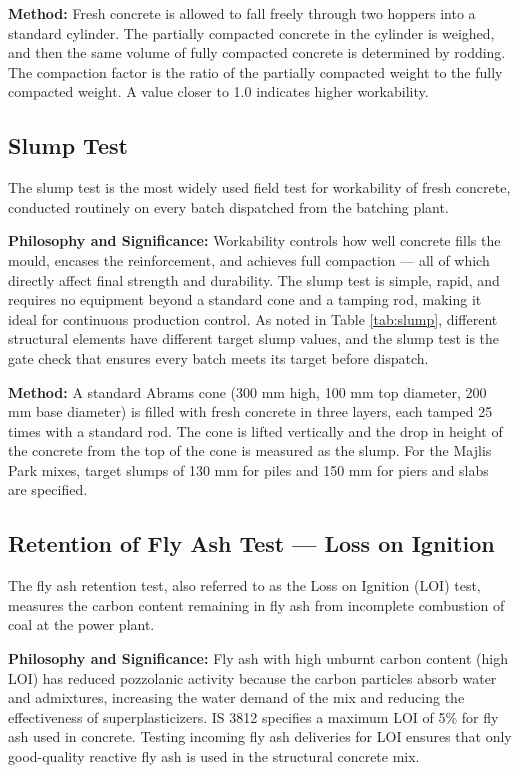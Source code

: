 \par\noindent
\textbf{Method:} Fresh concrete is allowed to fall freely through two hoppers into a standard cylinder. The partially compacted concrete in the cylinder is weighed, and then the same volume of fully compacted concrete is determined by rodding. The compaction factor is the ratio of the partially compacted weight to the fully compacted weight. A value closer to 1.0 indicates higher workability.

\subsection{Slump Test}
\par\noindent
The slump test is the most widely used field test for workability of fresh concrete, conducted routinely on every batch dispatched from the batching plant.

\par\noindent
\textbf{Philosophy and Significance:} Workability controls how well concrete fills the mould, encases the reinforcement, and achieves full compaction --- all of which directly affect final strength and durability. The slump test is simple, rapid, and requires no equipment beyond a standard cone and a tamping rod, making it ideal for continuous production control. As noted in Table \ref{tab:slump}, different structural elements have different target slump values, and the slump test is the gate check that ensures every batch meets its target before dispatch.

\par\noindent
\textbf{Method:} A standard Abrams cone (300 mm high, 100 mm top diameter, 200 mm base diameter) is filled with fresh concrete in three layers, each tamped 25 times with a standard rod. The cone is lifted vertically and the drop in height of the concrete from the top of the cone is measured as the slump. For the Majlis Park mixes, target slumps of 130 mm for piles and 150 mm for piers and slabs are specified.

\subsection{Retention of Fly Ash Test --- Loss on Ignition}
\par\noindent
The fly ash retention test, also referred to as the Loss on Ignition (LOI) test, measures the carbon content remaining in fly ash from incomplete combustion of coal at the power plant.

\par\noindent
\textbf{Philosophy and Significance:} Fly ash with high unburnt carbon content (high LOI) has reduced pozzolanic activity because the carbon particles absorb water and admixtures, increasing the water demand of the mix and reducing the effectiveness of superplasticizers. IS 3812 specifies a maximum LOI of 5\% for fly ash used in concrete. Testing incoming fly ash deliveries for LOI ensures that only good-quality reactive fly ash is used in the structural concrete mix.


